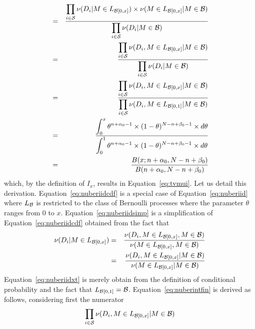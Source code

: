 \documentclass[]{article}
\begin{document}
\begin{eqnarray}
  & = &
  \frac{\displaystyle
        \prod_{i\in \mathcal{S}} \nu(D_{i} | M \in L_{\mathcal{B}[0,x]})
        \times \nu(M \in L_{\mathcal{B}[0,x]} | M \in \mathcal{B})}
       {\displaystyle
        \prod_{i\in \mathcal{S}} \nu(D_{i} | M \in \mathcal{B})}
  \label{eq:nuberiidcdf}\\
  & = &
  \frac{\displaystyle
        \prod_{i\in \mathcal{S}}
        \nu(D_{i}, M \in L_{\mathcal{B}[0,x]} | M \in \mathcal{B})}
       {\displaystyle
        \prod_{i\in \mathcal{S}}
        \nu(D_{i} | M \in \mathcal{B})}
       \label{eq:nuberiidsimp}\\
  & = &
  \frac{\displaystyle
        \prod_{i\in \mathcal{S}}
        \nu(D_{i}, M \in L_{\mathcal{B}[0,x]} | M \in \mathcal{B})}
       {\displaystyle
        \prod_{i\in \mathcal{S}}
        \nu(D_{i}, M \in L_{\mathcal{B}[0,1]} | M \in \mathcal{B})}
       \label{eq:nuberiidxt}\\
  & = &
  \frac{\displaystyle
        \int_0^x
        \theta^{n + \alpha_0 - 1} \times (1-\theta)^{N-n + \beta_0 - 1} \times d\theta}
       {\displaystyle
        \int_0^1
        \theta^{n + \alpha_0 - 1} \times (1-\theta)^{N-n + \beta_0 - 1} \times d\theta}
       \label{eq:nuberintfin}\\
  & = &
  \frac{B(x; n + \alpha_0, N-n + \beta_0)}{B(n + \alpha_0, N-n + \beta_0)}
  \label{eq:nuberbeta}
\end{eqnarray}
which, by the definition of $I_x$, results in Equation~\ref{eq:tvmui}.
Let us detail this derivation.  Equation~\ref{eq:nuberiidcdf} is a
special case of Equation~\ref{eq:nuberiid} where $L_{\mathcal{B}}$ is
restricted to the class of Bernoulli processes where the parameter
$\theta$ ranges from 0 to $x$.  Equation~\ref{eq:nuberiidsimp} is a
simplification of Equation~\ref{eq:nuberiidcdf} obtained from the fact
that
\begin{eqnarray}
  \nu(D_{i} | M \in L_{\mathcal{B}[0,x]})
  & = &
  \frac{\nu(D_{i}, M \in L_{\mathcal{B}[0,x]}, M \in \mathcal{B})}
       {\nu(M \in L_{\mathcal{B}[0,x]}, M \in \mathcal{B})}\\
  & = &
  \frac{\nu(D_{i}, M \in L_{\mathcal{B}[0,x]} | M \in \mathcal{B})}
       {\nu(M \in L_{\mathcal{B}[0,x]} | M \in \mathcal{B})}
\end{eqnarray}
Equation~\ref{eq:nuberiidxt} is merely obtain from the definition of
conditional probability and the fact that $L_{\mathcal{B}[0,1]} =
\mathcal{B}$.  Equation~\ref{eq:nuberintfin} is derived as follows,
considering first the numerator
$$\displaystyle \prod_{i\in \mathcal{S}} \nu(D_{i}, M \in
L_{\mathcal{B}[0,x]} | M \in \mathcal{B})$$
\end{document}
